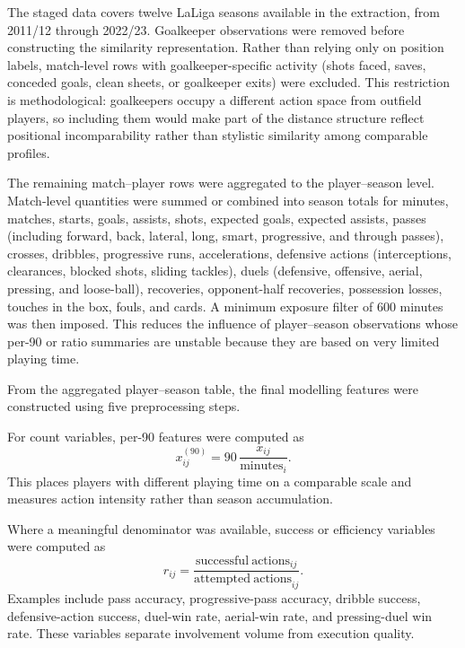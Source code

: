 The staged data covers twelve LaLiga seasons available in the extraction, from 2011/12 through 2022/23. Goalkeeper observations were removed before constructing the similarity representation. Rather than relying only on position labels, match-level rows with goalkeeper-specific activity (shots faced, saves, conceded goals, clean sheets, or goalkeeper exits) were excluded. This restriction is methodological: goalkeepers occupy a different action space from outfield players, so including them would make part of the distance structure reflect positional incomparability rather than stylistic similarity among comparable profiles.

The remaining match--player rows were aggregated to the player--season level. Match-level quantities were summed or combined into season totals for minutes, matches, starts, goals, assists, shots, expected goals, expected assists, passes (including forward, back, lateral, long, smart, progressive, and through passes), crosses, dribbles, progressive runs, accelerations, defensive actions (interceptions, clearances, blocked shots, sliding tackles), duels (defensive, offensive, aerial, pressing, and loose-ball), recoveries, opponent-half recoveries, possession losses, touches in the box, fouls, and cards. A minimum exposure filter of 600 minutes was then imposed. This reduces the influence of player--season observations whose per-90 or ratio summaries are unstable because they are based on very limited playing time.

From the aggregated player--season table, the final modelling features were constructed using five preprocessing steps.

\begin{definition}
For count variables, per-90 features were computed as
\[
x^{(90)}_{ij}=90\,\frac{x_{ij}}{\mathrm{minutes}_i}.
\]
This places players with different playing time on a comparable scale and measures action intensity rather than season accumulation.
\end{definition}

\begin{definition}
Where a meaningful denominator was available, success or efficiency variables were computed as
\[
r_{ij}=\frac{\mathrm{successful\ actions}_{ij}}{\mathrm{attempted\ actions}_{ij}}.
\]
Examples include pass accuracy, progressive-pass accuracy, dribble success, defensive-action success, duel-win rate, aerial-win rate, and pressing-duel win rate. These variables separate involvement volume from execution quality.
\end{definition}


